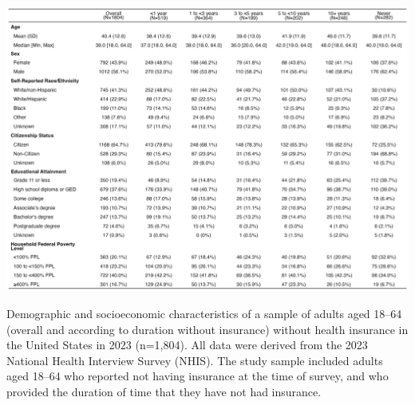 \documentclass[12pt]{article}
\begin{document}
\begin{table}
  \centering
  \includegraphics[width=22cm]{figures/table_1.png}
  \caption{Demographic and socioeconomic characteristics of a sample of adults aged 18–64 (overall and according to duration without insurance) without health insurance in the United States in 2023 (n=1,804). All data were derived from the 2023 National Health Interview Survey (NHIS). The study sample included adults aged 18–64 who reported not having insurance at the time of survey, and who provided the duration of time that they have not had insurance.}
\end{table}


\newpage

\printbibliography
\end{document}
